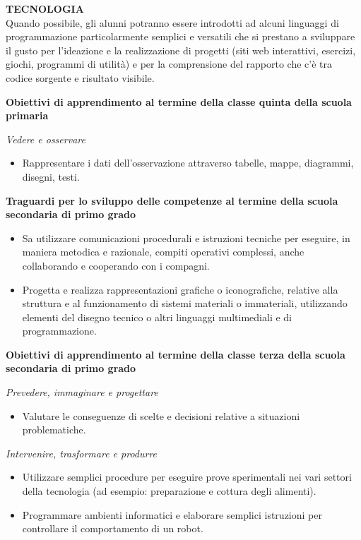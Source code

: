 \documentclass[12pt]{report}
\begin{document}
\bigskip
\noindent \textbf{TECNOLOGIA}
\\
Quando possibile, gli alunni potranno essere introdotti ad alcuni linguaggi di programmazione particolarmente semplici e versatili che si prestano a sviluppare il gusto per l'ideazione e la realizzazione di progetti (siti web interattivi, esercizi, giochi, programmi di utilità) e per la comprensione del rapporto che c'è tra codice sorgente e risultato visibile.


\medskip
\noindent \textbf{Obiettivi di apprendimento al termine della classe quinta della scuola primaria}
\begin{description}
	\item \textit{Vedere e osservare}
	\begin{itemize}
		\item Rappresentare i dati dell'osservazione attraverso tabelle, mappe, diagrammi, disegni, testi.
	\end{itemize}
\end{description}


\bigskip 
\noindent \textbf{Traguardi per lo sviluppo delle competenze al termine della scuola secondaria di primo grado}
\begin{itemize}
	\item Sa utilizzare comunicazioni procedurali e istruzioni tecniche per eseguire, in maniera metodica e razionale, compiti operativi complessi, anche collaborando e cooperando con i compagni.
	\item Progetta e realizza rappresentazioni grafiche o iconografiche, relative alla struttura e al funzionamento di sistemi materiali o immateriali, utilizzando elementi del disegno tecnico o altri linguaggi multimediali e di programmazione.
\end{itemize}

\medskip
\noindent \textbf{Obiettivi di apprendimento al termine della classe terza della scuola secondaria di primo grado}
\begin{description}
	\item \textit{Prevedere, immaginare e progettare}
	\begin{itemize}
		\item Valutare le conseguenze di scelte e decisioni relative a situazioni problematiche.
	\end{itemize}
	\item \textit{Intervenire, trasformare e produrre}
	\begin{itemize}
		\item Utilizzare semplici procedure per eseguire prove sperimentali nei vari settori della tecnologia (ad esempio: preparazione e cottura degli alimenti).
		\item Programmare ambienti informatici e elaborare semplici istruzioni per controllare il comportamento di un robot.
	\end{itemize}
\end{description}
\end{document}
